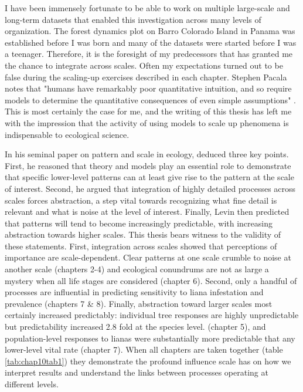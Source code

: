 \documentclass[b5paper,justified]{tufte-book} %
\begin{document}
I have been immensely fortunate to be able to work on multiple large-scale and long-term datasets that enabled this investigation across many levels of organization. The forest dynamics plot on Barro Colorado Island in Panama was established before I was born and many of the datasets were started before I was a teenager. Therefore, it is the foresight of my predecessors that has granted me the chance to integrate across scales. Often my expectations turned out to be false during the scaling-up exercises described in each chapter. Stephen Pacala notes that "humans have remarkably poor quantitative intuition, and so require models to determine the quantitative consequences of even simple assumptions" \citep{Pacala1997}. This is most certainly the case for me, and the writing of this thesis has left me with the impression that the activity of using models to scale up phenomena is indispensable to ecological science. \begin{fullwidth}

\hspace{.4cm} In his seminal paper on pattern and scale in ecology, \citet{Levin1992} deduced three key points. First, he reasoned that theory and models play an essential role to demonstrate that specific lower-level patterns can at least give rise to the pattern at the scale of interest. Second, he argued that integration of highly detailed processes across scales forces abstraction, a step vital towards recognizing what fine detail is relevant and what is noise at the level of interest. Finally, Levin then predicted that patterns will tend to become increasingly predictable, with increasing abstraction towards higher scales.  This thesis bears witness to the validity of these statements. First, integration across scales showed that perceptions of importance are scale-dependent. Clear patterns at one scale crumble to noise at another scale (chapters 2-4) and ecological conundrums are not as large a mystery when all life stages are considered (chapter 6). Second, only a handful of processes are influential in predicting sensitivity to liana infestation and prevalence (chapters 7 \& 8). Finally, abstraction toward larger scales most certainly increased predictably: individual tree responses are highly unpredictable but predictability increased 2.8 fold at the species level. (chapter 5), and population-level responses to lianas were substantially more predictable that any lower-level vital rate (chapter 7).  When all chapters are taken together (table \ref{tab:chap10tab1}) they demonstrate the profound influence scale has on how we interpret results and understand the links between processes operating at different levels. 


\end{fullwidth}
\end{document}

